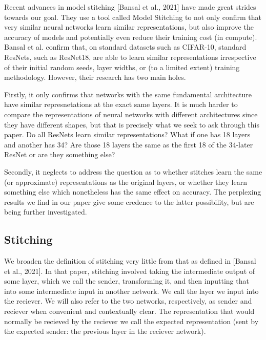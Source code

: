 \documentclass{article} %
\begin{document}
Recent advances in model stitching [Bansal et al., 2021] have made great strides towards our goal. They use
a tool called Model Stitching to not only confirm that very similar neural networks learn similar representations, but
also improve the accuracy of models and potentially even reduce their training cost (in compute). Bansal et al.
confirm that, on standard datasets such as CIFAR-10, standard ResNets, such as ResNet18, are able to learn similar
representations irrespective of their initial random seeds, layer widths, or (to a limited extent) training methodology.
However, their research has two main holes.

Firstly, it only confirms that networks with the same fundamental architecture have similar represnetations at
the exact same layers. It is much harder to compare the representations of neural networks with different architectures
since they have different shapes, but that is precisely what we seek to ask through this paper. Do all ResNets learn
similar representations? What if one has 18 layers and another has 34? Are those 18 layers the same as the first 18
of the 34-later ResNet or are they something else?

Secondly, it neglects to address the question as to whether stitches learn the same (or approximate)
representations as the original layers, or whether they learn something else which nonetheless has the
same effect on accuracy. The perplexing results we find in our paper give some credence to the latter
possibility, but are being further investigated.

\subsection{Stitching}
We broaden the definition of stitching very little from that as defined in [Bansal et al., 2021]. In that paper,
stitching involved taking the intermediate output of some layer, which we call the sender, transforming it, and then
inputting that into some intermediate input in another network. We call the layer we input into the reciever. We
will also refer to the two networks, respectively, as sender and reciever when convenient and contextually clear.
The representation that would normally be recieved by the reciever we call the expected representation (sent by
the expected sender: the previous layer in the reciever network).
\end{document}
